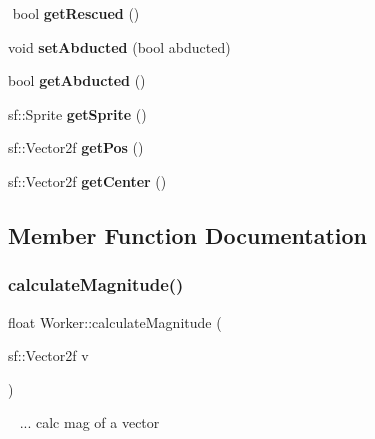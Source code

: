 \begin{DoxyCompactItemize}
$$\mbox{\label{class_worker_afe18a64d13904bf62f2b27b21ff1fc67}} 
bool {\bfseries get\+Rescued} ()
\item 
\mbox{\label{class_worker_a5e424fc42047b6b246f140c6c6190d29}} 
void {\bfseries set\+Abducted} (bool abducted)
\item 
\mbox{\label{class_worker_acae6aa29c48a0da9b274cba3eb083319}} 
bool {\bfseries get\+Abducted} ()
\item 
\mbox{\label{class_worker_ab4adcdb749d44a8be633466d2f20c9bd}} 
sf\+::\+Sprite {\bfseries get\+Sprite} ()
\item 
\mbox{\label{class_worker_af8d4a69952c44caf94b37b75f42f343c}} 
sf\+::\+Vector2f {\bfseries get\+Pos} ()
\item 
\mbox{\label{class_worker_a06c1679fcf49735590f36c4a84745ca1}} 
sf\+::\+Vector2f {\bfseries get\+Center} ()
\end{DoxyCompactItemize}


\subsection{Member Function Documentation}
\mbox{\label{class_worker_afaf8d6984011df1daa5ef9cd53abb4cc}} 
\subsubsection{\texorpdfstring{calculate\+Magnitude()}{calculateMagnitude()}\hspace{0.1cm}{\footnotesize\ttfamily [1/2]}}
{\footnotesize\ttfamily float Worker\+::calculate\+Magnitude (\begin{DoxyParamCaption}\item[{sf\+::\+Vector2f}]{v }\end{DoxyParamCaption})}

~\newline
... calc mag of a vector\mbox{\label{class_worker_a00fc71b506eeeef4c431c40145057306}} 
